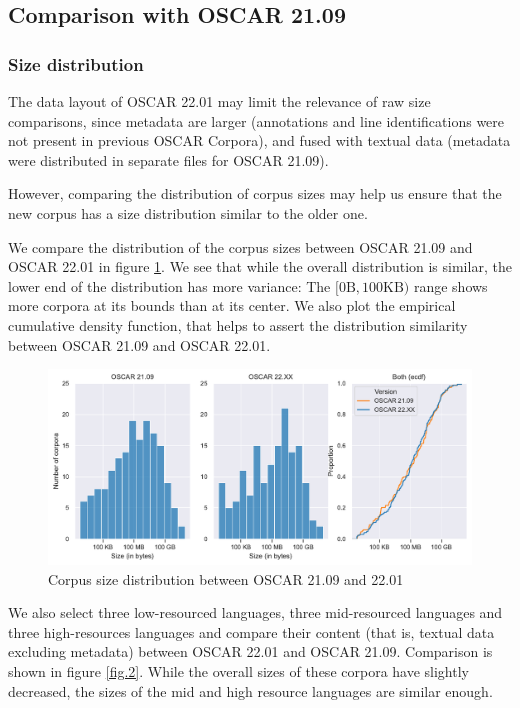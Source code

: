 \subsection{Comparison with OSCAR 21.09}
\subsubsection{Size distribution}

The data layout of OSCAR 22.01 may limit the relevance of raw size comparisons, since metadata are larger (annotations and line identifications were not present in previous OSCAR Corpora), and fused with textual data (metadata were distributed in separate files for OSCAR 21.09).

However, comparing the distribution of corpus sizes may help us ensure that the new corpus has a size distribution similar to the older one.

We compare the distribution of the corpus sizes between OSCAR 21.09 and OSCAR 22.01 in figure \ref{fig.1}. We see that while the overall distribution is similar, the lower end of the distribution has more variance: The $[0\text{B}, 100\text{KB})$ range shows more corpora at its bounds than at its center. We also plot the empirical cumulative density function, that helps to assert the distribution similarity between OSCAR 21.09 and OSCAR 22.01.

\begin{figure}[!ht]
    \begin{center}
        \includegraphics[scale=0.7]{static/media/data/towards/size-comp}
        \caption{Corpus size distribution between OSCAR 21.09 and 22.01}
        \label{fig.1}
    \end{center}
\end{figure}

We also select three low-resourced languages, three mid-resourced languages and three high-resources languages and compare their content (that is, textual data excluding metadata) between OSCAR 22.01 and OSCAR 21.09. Comparison is shown in figure \ref{fig.2}. While the overall sizes of these corpora  have slightly decreased, the sizes of the mid and high resource languages are similar enough.

